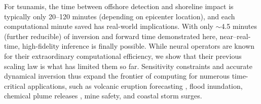For tsunamis, the time between offshore detection and shoreline impact is typically only 20--120 minutes (depending on epicenter location), and each computational minute saved has real-world implications. With only $\sim$4.5 minutes (further reducible) of inversion and forward time demonstrated here, near--real-time, high-fidelity inference is finally possible. While neural operators are known for their extraordinary computational efficiency, we show that their previous scaling law is what has limited them so far. Sensitivity constraints and accurate dynamical inversion thus expand the frontier of computing for numerous time-critical applications, such as volcanic eruption forecasting \cite{rutarindwa2019dynamic}, flood inundation, chemical plume releases \cite{di2020kalman}, mine safety, and coastal storm surges.